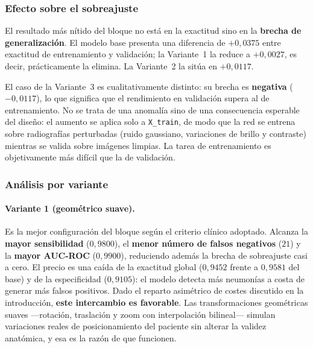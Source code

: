 \documentclass[11pt, a4paper]{article}
\numberwithin{equation}{section}
\begin{document}
\subsubsection{Efecto sobre el sobreajuste}

El resultado más nítido del bloque no está en la exactitud sino en la
\textbf{brecha de generalización}. El modelo base presenta una diferencia de $+0{,}0375$
entre exactitud de entrenamiento y validación; la Variante~1 la reduce a $+0{,}0027$,
es decir, prácticamente la elimina. La Variante~2 la sitúa en $+0{,}0117$.

El caso de la Variante~3 es cualitativamente distinto: su brecha es \textbf{negativa}
($-0{,}0117$), lo que significa que el rendimiento en validación supera al de
entrenamiento. No se trata de una anomalía sino de una consecuencia esperable del
diseño: el aumento se aplica solo a \texttt{X\_train}, de modo que la red se entrena
sobre radiografías perturbadas (ruido gaussiano, variaciones de brillo y contraste)
mientras se valida sobre imágenes limpias. La tarea de entrenamiento es
objetivamente más difícil que la de validación.

\subsubsection{Análisis por variante}

\paragraph{Variante 1 (geométrico suave).}
Es la mejor configuración del bloque según el criterio clínico adoptado. Alcanza la
\textbf{mayor sensibilidad} ($0{,}9800$), el \textbf{menor número de falsos negativos}
($21$) y la \textbf{mayor AUC-ROC} ($0{,}9900$), reduciendo además la brecha de
sobreajuste casi a cero. El precio es una caída de la exactitud global
($0{,}9452$ frente a $0{,}9581$ del base) y de la especificidad ($0{,}9105$): el modelo
detecta más neumonías a costa de generar más falsos positivos. Dado el reparto
asimétrico de costes discutido en la introducción, \textbf{este intercambio es
favorable}. Las transformaciones geométricas suaves ---rotación, traslación y zoom con
interpolación bilineal--- simulan variaciones reales de posicionamiento del paciente
sin alterar la validez anatómica, y esa es la razón de que funcionen.
\end{document}
